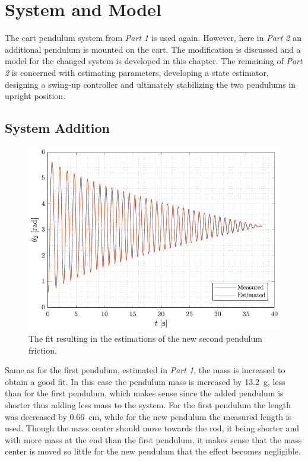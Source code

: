 \chapter{System and Model}
The cart pendulum system from \textit{Part 1} is used again. However, here in \textit{Part 2} an additional pendulum is mounted on the cart. The modification is discussed and a model for the changed system is developed in this chapter. The remaining of \textit{Part 2} is concerned with estimating parameters, developing a state estimator, designing a swing-up controller and ultimately stabilizing the two pendulums in upright position.

\section{System Addition}

\begin{figure}[H]
  \includegraphics[width=.7\textwidth]{figures/pendulum2Est}
  \caption{The fit resulting in the estimations of the new second pendulum friction.}
  \label{fig:pendulum2Est}
\end{figure}

Same as for the first pendulum, estimated in \textit{Part 1}, the mass is increased to obtain a good fit. In this case the pendulum mass is increased by \SI{13.2}{g}, less than for the first pendulum, which makes sense since the added pendulum is shorter thus adding less mass to the system. For the first pendulum the length was decreased by \SI{0.66}{cm}, while for the new pendulum the measured length is used. Though the mass center should move towards the rod, it being shorter and with more mass at the end than the first pendulum, it makes sense that the mass center is moved so little for the new pendulum that the effect becomes negligible.

